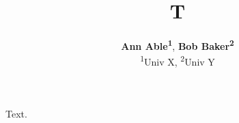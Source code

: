 \documentclass{article}
\begin{document}
\title{T}
\author{
 \textbf{Ann Able\textsuperscript{1}},
 \textbf{Bob Baker\textsuperscript{2}}
 \\
 \textsuperscript{1}Univ X, \textsuperscript{2}Univ Y
}
\maketitle
Text.
\end{document}

